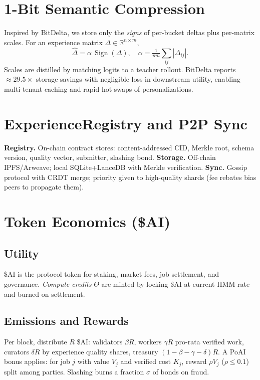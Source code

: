 \documentclass[11pt]{article}
\begin{document}
\section{1-Bit Semantic Compression}\label{sec:bitdelta}
Inspired by BitDelta, we store only the \emph{signs} of per-bucket deltas plus per-matrix scales. For an experience matrix \(\Delta \in \mathbb R^{n\times m}\),
\begin{equation}
 \widehat{\Delta} = \alpha\,\operatorname{Sign}(\Delta),\quad \alpha = \tfrac{1}{nm}\sum\limits_{ij} |\Delta_{ij}|.
\end{equation}
Scales are distilled by matching logits to a teacher rollout. BitDelta reports \(\approx 29.5\times\) storage savings with negligible loss in downstream utility, enabling multi-tenant caching and rapid hot-swaps of personalizations.

\section{ExperienceRegistry and P2P Sync}
\textbf{Registry.} On-chain contract stores: content-addressed CID, Merkle root, schema version, quality vector, submitter, slashing bond. \textbf{Storage.} Off-chain IPFS/Arweave; local SQLite+LanceDB with Merkle verification. \textbf{Sync.} Gossip protocol with CRDT merge; priority given to high-quality shards (fee rebates bias peers to propagate them).

\section{Token Economics (\$AI)}
\subsection{Utility}
\$AI is the protocol token for staking, market fees, job settlement, and governance. \emph{Compute credits} \(\Theta\) are minted by locking \$AI at current HMM rate and burned on settlement.

\subsection{Emissions and Rewards}
Per block, distribute \(R\) \$AI: validators \(\beta R\), workers \(\gamma R\) pro-rata verified work, curators \(\delta R\) by experience quality shares, treasury \((1-\beta-\gamma-\delta)R\). A PoAI bonus applies: for job \(j\) with value \(V_j\) and verified cost \(K_j\), reward \(\rho V_j\) (\(\rho\le 0.1\)) split among parties. Slashing burns a fraction \(\sigma\) of bonds on fraud.
\end{document}
